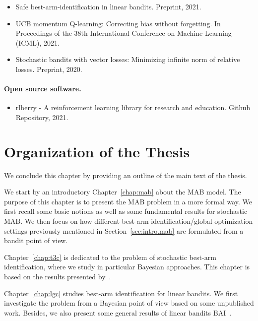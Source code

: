 \begin{itemize}[label=]
    \item Safe best-arm-identification in linear bandits. Preprint, 2021.~\citep{shang2021safe}
    \item UCB momentum Q-learning: Correcting bias without forgetting. In Proceedings of the 38th International Conference on Machine Learning (ICML), 2021.~\citep{menard2021ucbmq}
    \item Stochastic bandits with vector losses: Minimizing infinite norm of relative losses. Preprint, 2020.~\citep{shang2020vector}
\end{itemize}

\paragraph{Open source software.}

\begin{itemize}[label=]
    \item rlberry - A reinforcement learning library for research and education. Github Repository, 2021.~\citep{rlberry2021}
\end{itemize}

\section{Organization of the Thesis}\label{sec:intro.organization}

We conclude this chapter by providing an outline of the main text of the thesis. 

We start by an introductory Chapter~\ref{chap:mab} about the MAB model. The purpose of this chapter is to present the MAB problem in a more formal way. We first recall some basic notions as well as some fundamental results for stochastic MAB. We then focus on how different best-arm identification/global optimization settings previously mentioned in Section~\ref{sec:intro.mab} are formulated from a bandit point of view.

Chapter~\ref{chap:t3c} is dedicated to the problem of stochastic best-arm identification, where we study in particular Bayesian approaches. This chapter is based on the results presented by~\cite{shang2020t3c}.

Chapter~\ref{chap:lgc} studies best-arm identification for linear bandits. We first investigate the problem from a Bayesian point of view based on some unpublished work. Besides, we also present some general results of linear bandits BAI~\citep{degenne2020game}. 


